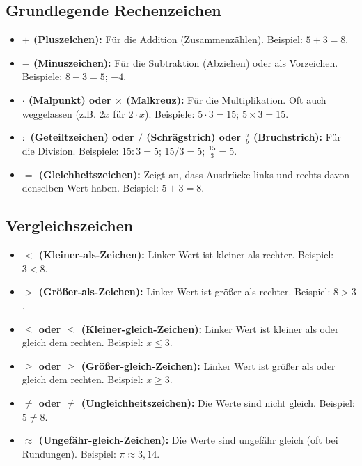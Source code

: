 \subsection{Grundlegende Rechenzeichen}
\begin{itemize}
    \item \textbf{$+$ (Pluszeichen):} Für die Addition (Zusammenzählen). Beispiel: $5+3=8$.
    \item \textbf{$-$ (Minuszeichen):} Für die Subtraktion (Abziehen) oder als Vorzeichen. Beispiele: $8-3=5$; $-4$.
    \item \textbf{$\cdot$ (Malpunkt) oder $\times$ (Malkreuz):} Für die Multiplikation. Oft auch weggelassen (z.B. $2x$ für $2 \cdot x$). Beispiele: $5 \cdot 3 = 15$; $5 \times 3 = 15$.
    \item \textbf{$:$ (Geteiltzeichen) oder $/$ (Schrägstrich) oder $\frac{a}{b}$ (Bruchstrich):} Für die Division. Beispiele: $15:3=5$; $15/3=5$; $\frac{15}{3}=5$.
    \item \textbf{$=$ (Gleichheitszeichen):} Zeigt an, dass Ausdrücke links und rechts davon denselben Wert haben. Beispiel: $5+3=8$.
\end{itemize}

\subsection{Vergleichszeichen}
\begin{itemize}
    \item \textbf{$<$ (Kleiner-als-Zeichen):} Linker Wert ist kleiner als rechter. Beispiel: $3 < 8$.
    \item \textbf{$>$ (Größer-als-Zeichen):} Linker Wert ist größer als rechter. Beispiel: $8 > 3$.
    \item \textbf{$\le$ oder $\leq$ (Kleiner-gleich-Zeichen):} Linker Wert ist kleiner als oder gleich dem rechten. Beispiel: $x \le 3$.
    \item \textbf{$\ge$ oder $\geq$ (Größer-gleich-Zeichen):} Linker Wert ist größer als oder gleich dem rechten. Beispiel: $x \ge 3$.
    \item \textbf{$\ne$ oder $\neq$ (Ungleichheitszeichen):} Die Werte sind nicht gleich. Beispiel: $5 \ne 8$.
    \item \textbf{$\approx$ (Ungefähr-gleich-Zeichen):} Die Werte sind ungefähr gleich (oft bei Rundungen). Beispiel: $\pi \approx 3,14$.
\end{itemize}

